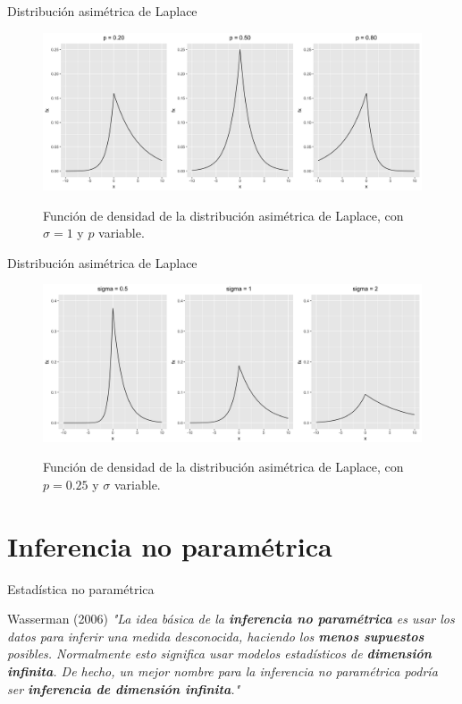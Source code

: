 \documentclass{beamer}
\begin{document}
\begin{frame}{Distribuci\'on asim\'etrica de Laplace}
  \begin{figure}[H]
	\centering
	\caption{Funci\'on de densidad de la distribuci\'on asim\'etrica de Laplace, con $\sigma = 1$ y $p$ variable.}
	\includegraphics[width=1\textwidth]{Figures/ALD/p_plots.png}
	\label{p_plots}
  \end{figure}
\end{frame}

\begin{frame}{Distribuci\'on asim\'etrica de Laplace}
  \begin{figure}[H]
	\centering
	\caption{Funci\'on de densidad de la distribuci\'on asim\'etrica de Laplace, con $p = 0.25$ y $\sigma$ variable.}
	\includegraphics[width=1\textwidth]{Figures/ALD/sigma_plots.png}
	\label{p_plots}
  \end{figure}
\end{frame}


\section{Inferencia no param\'etrica}

\begin{frame}{Estad\'istica no param\'etrica}
\begin{block}{Wasserman (2006)}
    \textit{"La idea b\'asica de la \textbf{inferencia no param\'etrica} es usar los datos para inferir una medida desconocida, haciendo los \textbf{menos supuestos} posibles. Normalmente esto significa usar modelos estad\'isticos de \textbf{dimensi\'on infinita}. De hecho, un mejor nombre para la inferencia no param\'etrica podr\'ia ser \textbf{inferencia de dimensi\'on infinita}."}
\end{block}
\end{frame}
\end{document}
